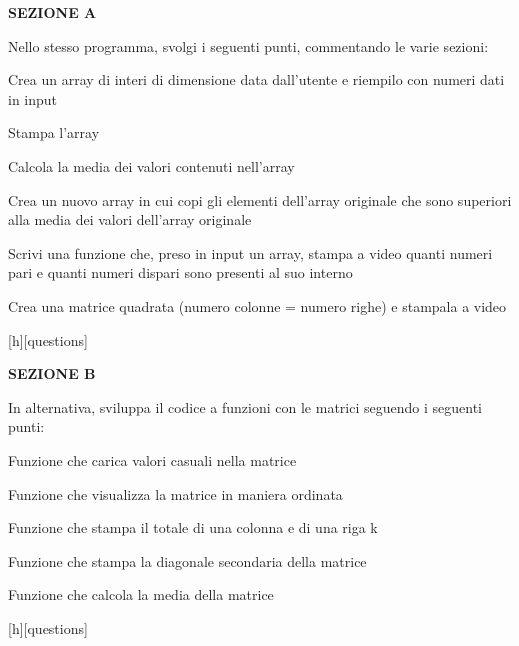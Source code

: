 \documentclass[addpoints]{exam}
\begin{document}
 
 \begin{center}
 \end{center}
 
\vspace{5mm}
 
 
\vspace{5mm}
 
 
\vspace{10mm}

\begin{center}
	\huge{\textbf{SEZIONE A}}
\end{center}

Nello stesso programma, svolgi i seguenti punti, commentando le varie sezioni:
\begin{questions}
	
\question[1] Crea un array di interi di dimensione data dall'utente e riempilo con numeri dati in input

\question[1] Stampa l'array

\question[2] Calcola la media dei valori contenuti nell'array

\question[2] Crea un nuovo array in cui copi gli elementi dell'array originale che sono superiori alla media dei valori dell'array originale

\question[2] Scrivi una funzione che, preso in input un array, stampa a video quanti numeri pari e quanti numeri dispari sono presenti al suo interno

\question[2] Crea una matrice quadrata (numero colonne = numero righe) e stampala a video


\begin{center}
	[questions]
\end{center}

\begin{center}
	\huge{\textbf{SEZIONE B}}
\end{center}

In alternativa, sviluppa il codice a funzioni con le matrici seguendo i seguenti punti:

	
\question[2] Funzione che carica valori casuali nella matrice

\question[2] Funzione che visualizza la matrice in maniera ordinata

\question[2] Funzione che stampa il totale di una colonna e di una riga k

\question[2] Funzione che stampa la diagonale secondaria della matrice

\question[2] Funzione che calcola la media della matrice

\end{questions}


\begin{center}
	[questions]
\end{center}
\end{document}
